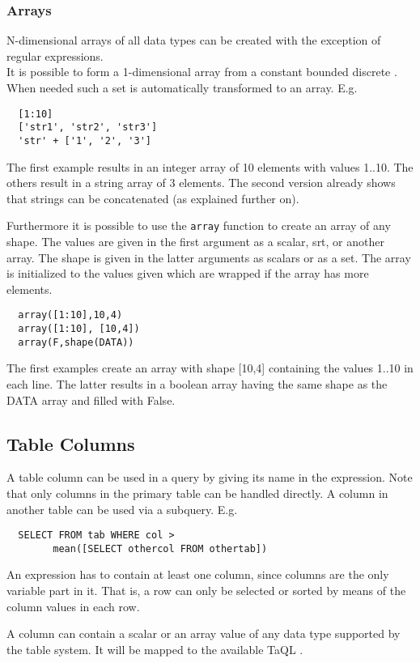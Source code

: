 \subsubsection{Arrays}
N-dimensional arrays of all data types can be created with the
exception of regular expressions. 
\\It is possible to form a 1-dimensional array from a constant bounded discrete
. When needed such a set is automatically
transformed to an array. E.g.
\begin{verbatim}
  [1:10]
  ['str1', 'str2', 'str3']
  'str' + ['1', '2', '3']
\end{verbatim}
The first example results in an integer array of 10 elements with values 1..10.
The others result in a string array of 3 elements. The second version already
shows that strings can be concatenated (as explained further on).

Furthermore it is possible to use the \texttt{array} function to
create an array of any shape. The values are given in the first
argument as a scalar, srt, or another array. The shape is given in the latter
arguments as scalars or as a set. The array is initialized to the
values given which are wrapped if the array has more elements.
\begin{verbatim}
  array([1:10],10,4)
  array([1:10], [10,4])
  array(F,shape(DATA))
\end{verbatim}
The first examples create an array with shape [10,4] containing the values
1..10 in each line.
The latter results in a boolean array having the same
shape as the DATA array and filled with False.

\subsection{\label{TAQL:COLUMNS}Table Columns}
A table column can be used in a query by giving its name in the
expression.
Note that only columns in the primary table can be handled directly.
A column in another table can be used via a subquery. E.g.
\begin{verbatim}
  SELECT FROM tab WHERE col >
        mean([SELECT othercol FROM othertab])
\end{verbatim}
An expression has to contain at least one column, since columns
are the only variable part in it. That is, a row can only be selected
or sorted by means of the column values in each row.

A column can contain a scalar or an array value of any data type
supported by the table system. It will be mapped to the available TaQL
.

